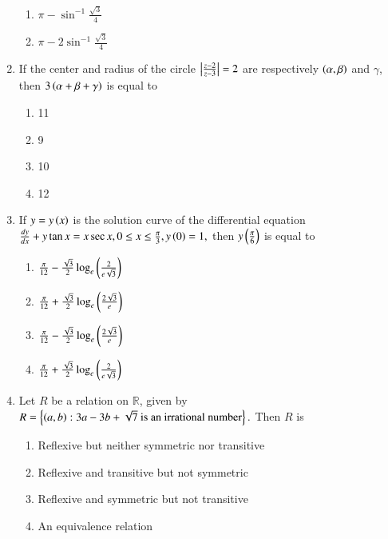 \documentclass[journal]{IEEEtran}
\begin{document}
\begin{enumerate}
\begin{multicols}{2}
\begin{enumerate}
\item $\pi-\sin^{-1}\frac{\sqrt 3}{4}$
\item $\pi-2\sin^{-1}\frac{\sqrt 3}{4}$
\end{enumerate}
\end{multicols}
\item If the center and radius of the circle $\left\vert\frac{z-2}{z-3}\right\vert=2$ are respectively $\left(\alpha ,\beta\right)$ and $\gamma$, then $3\left(\alpha +\beta +\gamma\right)$ is equal to 
\begin{multicols}{2}
\begin{enumerate}
\item 11
\item 9
\item 10
\item 12
\end{enumerate}
\end{multicols}
\item If $y=y\left(x\right)$ is the solution curve of the differential equation $\frac{dy}{dx}+y\tan{x}=x\sec{x}, 0\le x\le \frac{\pi}{3},y\left(0\right)=1,$ then $y\left(\frac{\pi}{6}\right)$  is equal to
\begin{enumerate}
\item $\frac{\pi}{12}-\frac{\sqrt 3}{2}\log_e\left(\frac{2}{e\sqrt 3}\right)$
\item $\frac{\pi}{12}+\frac{\sqrt 3}{2}\log_e\left(\frac{2\sqrt 3}{e}\right)$
\item $\frac{\pi}{12}-\frac{\sqrt 3}{2}\log_e\left(\frac{2\sqrt 3}{e}\right)$
\item $\frac{\pi}{12}+\frac{\sqrt 3}{2}\log_e\left(\frac{2}{e\sqrt 3}\right)$
\end{enumerate}
\item Let $R$ be a relation on $\mathbb{R}$, given by $R=\left\{\left(a,b\right): 3a-3b+\sqrt7 \text{ is an irrational number}\right\}.$ Then $R$ is 
\begin{enumerate}
\item Reflexive but neither symmetric nor transitive 
\item Reflexive and transitive but not symmetric 
\item Reflexive and symmetric but not transitive 
\item An equivalence relation  
\end{enumerate}	
\end{enumerate}
\end{document}
